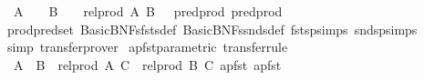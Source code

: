 \begin{isabellebody}
\ \ {\isachardoublequoteopen}{\isacharparenleft}{\kern0pt}{\isacharparenleft}{\kern0pt}A\ {\isacharequal}{\kern0pt}{\isacharequal}{\kern0pt}{\isacharequal}{\kern0pt}{\isachargreater}{\kern0pt}\ {\isacharparenleft}{\kern0pt}{\isacharequal}{\kern0pt}{\isacharparenright}{\kern0pt}{\isacharparenright}{\kern0pt}\ {\isacharequal}{\kern0pt}{\isacharequal}{\kern0pt}{\isacharequal}{\kern0pt}{\isachargreater}{\kern0pt}\ {\isacharparenleft}{\kern0pt}B\ {\isacharequal}{\kern0pt}{\isacharequal}{\kern0pt}{\isacharequal}{\kern0pt}{\isachargreater}{\kern0pt}\ {\isacharparenleft}{\kern0pt}{\isacharequal}{\kern0pt}{\isacharparenright}{\kern0pt}{\isacharparenright}{\kern0pt}\ {\isacharequal}{\kern0pt}{\isacharequal}{\kern0pt}{\isacharequal}{\kern0pt}{\isachargreater}{\kern0pt}\ rel{\isacharunderscore}{\kern0pt}prod\ A\ B\ {\isacharequal}{\kern0pt}{\isacharequal}{\kern0pt}{\isacharequal}{\kern0pt}{\isachargreater}{\kern0pt}\ {\isacharparenleft}{\kern0pt}{\isacharequal}{\kern0pt}{\isacharparenright}{\kern0pt}{\isacharparenright}{\kern0pt}\ pred{\isacharunderscore}{\kern0pt}prod\ pred{\isacharunderscore}{\kern0pt}prod{\isachardoublequoteclose}\isanewline
%
\isadelimproof
%
\endisadelimproof
%
\isatagproof
{}\isamarkupfalse%
\ prod{\isachardot}{\kern0pt}pred{\isacharunderscore}{\kern0pt}set\ Basic{\isacharunderscore}{\kern0pt}BNFs{\isachardot}{\kern0pt}fsts{\isacharunderscore}{\kern0pt}def\ Basic{\isacharunderscore}{\kern0pt}BNFs{\isachardot}{\kern0pt}snds{\isacharunderscore}{\kern0pt}def\ fstsp{\isachardot}{\kern0pt}simps\ sndsp{\isachardot}{\kern0pt}simps\ \isanewline
{}\isamarkupfalse%
\ simp\ transfer{\isacharunderscore}{\kern0pt}prover%
\endisatagproof
{\isafoldproof}%
%
\isadelimproof
\isanewline
%
\endisadelimproof
\isanewline
{}\isamarkupfalse%
\ apfst{\isacharunderscore}{\kern0pt}parametric\ {\isacharbrackleft}{\kern0pt}transfer{\isacharunderscore}{\kern0pt}rule{\isacharbrackright}{\kern0pt}{\isacharcolon}{\kern0pt}\isanewline
\ \ {\isachardoublequoteopen}{\isacharparenleft}{\kern0pt}{\isacharparenleft}{\kern0pt}A\ {\isacharequal}{\kern0pt}{\isacharequal}{\kern0pt}{\isacharequal}{\kern0pt}{\isachargreater}{\kern0pt}\ B{\isacharparenright}{\kern0pt}\ {\isacharequal}{\kern0pt}{\isacharequal}{\kern0pt}{\isacharequal}{\kern0pt}{\isachargreater}{\kern0pt}\ rel{\isacharunderscore}{\kern0pt}prod\ A\ C\ {\isacharequal}{\kern0pt}{\isacharequal}{\kern0pt}{\isacharequal}{\kern0pt}{\isachargreater}{\kern0pt}\ rel{\isacharunderscore}{\kern0pt}prod\ B\ C{\isacharparenright}{\kern0pt}\ apfst\ apfst{\isachardoublequoteclose}\isanewline

\end{isabellebody}
